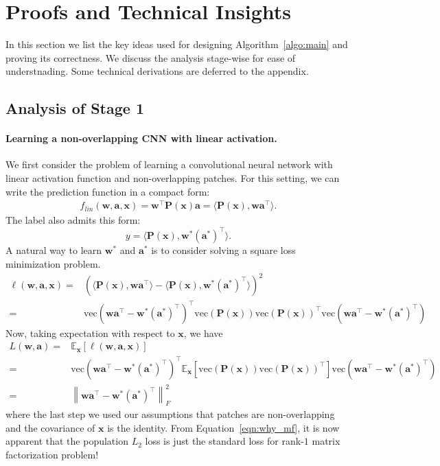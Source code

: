 \documentclass[11pt]{article}
\newcommand{\mat}[1]{\mathbf{#1}}
\newcommand{\vect}[1]{\mathbf{#1}}
\newcommand{\norm}[1]{\left\|#1\right\|}
\newcommand{\expect}{\mathbb{E}}
\newcommand{\vectorize}[1]{\text{vec}\left(#1\right)}
\begin{document}
\section{Proofs and Technical Insights}
\label{sec:analysis}
In this section we list the key ideas used for designing Algorithm~\ref{algo:main} and proving its correctness. We discuss the analysis stage-wise for ease of understnading. 
Some technical derivations are deferred to the appendix.

\subsection{Analysis of Stage 1}\label{sec:stage1_analysis}\paragraph{Learning a non-overlapping CNN with linear activation.}
We first consider the problem of learning a convolutional neural network with linear activation function and non-overlapping patches.
For this setting, we can write the prediction function in a compact form:\begin{align*}
	f_{lin}\left(\vect{w},\vect{a},\vect{x}\right) = \vect{w}^\top \mat{P}\left(\vect{x}\right)\vect{a} = \langle \mat{P}\left(\vect{x}\right),\vect{w}\vect{a}^\top \rangle.
\end{align*}
The label also admits this form:\[
y = \langle \mat{P}\left(\vect{x}\right),\vect{w}^*\left(\vect{a}^*\right)^\top \rangle.
\]
A natural way to learn $\vect{w}^*$ and $\vect{a}^*$ is to consider solving a square loss minimization problem.
\begin{align*}
 \ell\left(\vect{w},\vect{a},\vect{x}\right)= &\left(\langle \mat{P}\left(\vect{x}\right),\vect{w}\vect{a}^\top \rangle- \langle \mat{P}\left(\vect{x}\right),\vect{w}^*\left(\vect{a}^*\right)^\top \rangle\right)^2 \\
	= &\vectorize{\vect{w}\vect{a}^\top - \vect{w}^*\left(\vect{a}^*\right)^\top}^\top  \vectorize{\mat{P}\left(\vect{x}\right)}\vectorize{\mat{P}\left(\vect{x}\right)}^\top \vectorize{\vect{w}\vect{a}^\top - \vect{w}^*\left(\vect{a}^*\right)^\top}
\end{align*}
Now, taking expectation with respect to $\vect{x}$, we have \begin{align}
	L\left(\vect{w},\vect{a}\right) = &\expect_{\vect{x}} \left[\ell\left(\vect{w},\vect{a},\vect{x}\right)\right]  \nonumber\\
	= & \vectorize{\vect{w}\vect{a}^\top - \vect{w}^*\left(\vect{a}^*\right)^\top}^\top  \expect_{\vect{x}}\left[\vectorize{\mat{P}\left(\vect{x}\right)}\vectorize{\mat{P}\left(\vect{x}\right)}^\top \right]\vectorize{\vect{w}\vect{a}^\top - \vect{w}^*\left(\vect{a}^*\right)^\top} \nonumber\\
	= &\norm{\vect{w}\vect{a}^\top - \vect{w}^*\left(\vect{a}^*\right)^\top}_F^2 \label{eqn:why_mf}
\end{align}
where the last step we used our assumptions that patches are non-overlapping and the covariance of $\vect{x}$ is the identity.
From Equation~\eqref{eqn:why_mf}, it is now apparent that the population $L_2$ loss is just the standard loss for rank-$1$ matrix factorization problem!
\end{document}
